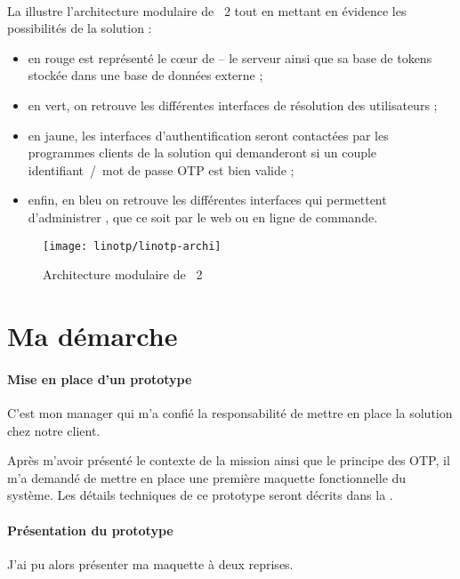 \paragraph{}
La  illustre l'architecture modulaire de \alinotp{}~2 tout en mettant en évidence les possibilités de la solution :

\begin{itemize}
	\item en rouge est représenté le c\oe ur de \alinotp{} -- le serveur ainsi que sa base de tokens stockée dans une base de données externe ;
	\item en vert, on retrouve les différentes interfaces de résolution des utilisateurs ;
	\item en jaune, les interfaces d'authentification seront contactées par les pro\-gram\-mes clients de la solution qui demanderont si un couple identifiant~/~mot de passe OTP est bien valide ;
	\item enfin, en bleu on retrouve les différentes interfaces qui permettent d'administrer \alinotp{}, que ce soit par le web ou en ligne de commande.
\end{itemize}

\begin{figure}
	\centering
	\texttt{[image: linotp/linotp-archi]}
	\caption{Architecture modulaire de \alinotp{}~2}
	\label{figure:linotp:linotp-archi}
\end{figure}


\section{Ma démarche}

\paragraph{Mise en place d'un prototype}
C'est mon manager \apakou{} qui m'a confié la responsabilité de mettre en place la solution \alinotp{} chez notre client.

Après m'avoir présenté le contexte de la mission ainsi que le principe des OTP, il m'a demandé de mettre en place une première maquette fonctionnelle du système.
Les détails techniques de ce prototype seront décrits dans la .

\paragraph{Présentation du prototype}
J'ai pu alors présenter ma maquette à deux reprises.

